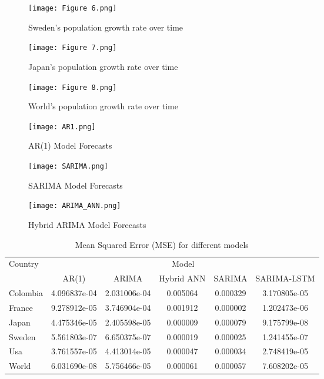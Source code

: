 \documentclass[hidelinks,11pts]{article}
\DeclareMathOperator{\1}{\mathbbm{1}}
\begin{document}
\begin{figure}
    \centering
    \texttt{[image: Figure 6.png]}
    \caption{Sweden's population growth rate over time}
    \label{fig:enter-label}
\end{figure}

\begin{figure}
    \centering
    \texttt{[image: Figure 7.png]}
    \caption{Japan's population growth rate over time}
    \label{fig:enter-label}
\end{figure}

\begin{figure}
    \centering
    \texttt{[image: Figure 8.png]}
    \caption{World's population growth rate over time}
    \label{fig:enter-label}
\end{figure}

\begin{figure}[htbp]
  \centering
  \texttt{[image: AR1.png]}
  \caption{AR(1) Model Forecasts}
  \label{fig:ar1}
\end{figure}

\begin{figure}[htbp]
  \centering
  \texttt{[image: SARIMA.png]}
  \caption{SARIMA Model Forecasts}
  \label{fig:ar1}
\end{figure}

\begin{figure}
    \centering
    \texttt{[image: ARIMA\_ANN.png]}
    \caption{Hybrid ARIMA Model Forecasts}
    \label{fig:hybARIMA}
\end{figure}

\newpage
\begin{table}[!htbp]
  \centering
  \caption{Mean Squared Error (MSE) for different models}
  \label{tab:mse}
  \begin{tabular}{lccccc}
    \toprule
    \multirow{2}{*}{Country} & \multicolumn{5}{c}{Model} \\
    \cmidrule(lr){2-6}
    & AR(1) & ARIMA & Hybrid ANN & SARIMA & SARIMA-LSTM \\
    \midrule
    Colombia & 4.096837e-04 & 2.031006e-04 & 0.005064 & 0.000329 & 3.170805e-05 \\
    France & 9.278912e-05 & 3.746904e-04 & 0.001912 & 0.000002 & 1.202473e-06 \\
    Japan & 4.475346e-05 & 2.405598e-05 & 0.000009 & 0.000079 & 9.175799e-08 \\
    Sweden & 5.561803e-07 & 6.650375e-07 & 0.000019 & 0.000025 & 1.241455e-07 \\
    Usa & 3.761557e-05 & 4.413014e-05 & 0.000047 & 0.000034 & 2.748419e-05 \\
    World & 6.031690e-08 & 5.756466e-05 & 0.000061 & 0.000057 & 7.608202e-05 \\
    \bottomrule
  \end{tabular}
\end{table}
\end{document}
